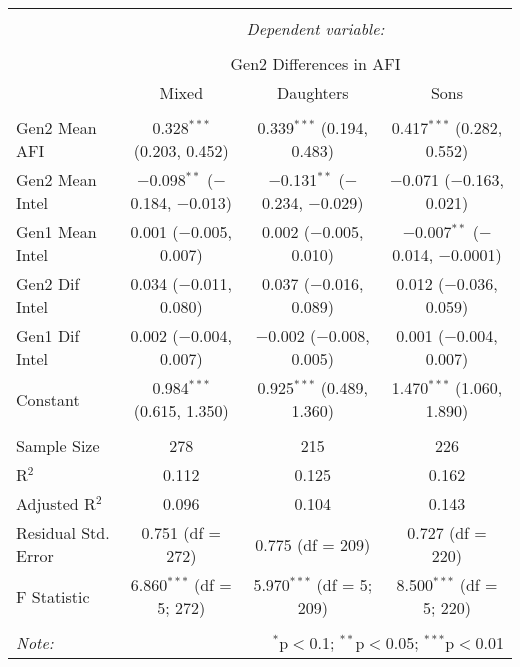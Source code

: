 
\begingroup 
\small 
\begin{tabular}{@{\extracolsep{1pt}}lccc} 
\\[-1.8ex]\hline 
\hline \\[-1.8ex] 
 & \multicolumn{3}{c}{\textit{Dependent variable:}} \\ 
\cline{2-4} 
\\[-1.8ex] & \multicolumn{3}{c}{Gen2 Differences in AFI} \\ 
 & Mixed & Daughters & Sons \\ 
\hline \\[-1.8ex] 
 Gen2 Mean AFI & 0.328$^{***}$ (0.203, 0.452) & 0.339$^{***}$ (0.194, 0.483) & 0.417$^{***}$ (0.282, 0.552) \\ 
  Gen2 Mean Intel & $-$0.098$^{**}$ ($-$0.184, $-$0.013) & $-$0.131$^{**}$ ($-$0.234, $-$0.029) & $-$0.071 ($-$0.163, 0.021) \\ 
  Gen1 Mean Intel & 0.001 ($-$0.005, 0.007) & 0.002 ($-$0.005, 0.010) & $-$0.007$^{**}$ ($-$0.014, $-$0.0001) \\ 
  Gen2 Dif Intel & 0.034 ($-$0.011, 0.080) & 0.037 ($-$0.016, 0.089) & 0.012 ($-$0.036, 0.059) \\ 
  Gen1 Dif Intel & 0.002 ($-$0.004, 0.007) & $-$0.002 ($-$0.008, 0.005) & 0.001 ($-$0.004, 0.007) \\ 
  Constant & 0.984$^{***}$ (0.615, 1.350) & 0.925$^{***}$ (0.489, 1.360) & 1.470$^{***}$ (1.060, 1.890) \\ 
 \hline \\[-1.8ex] 
Sample Size & 278 & 215 & 226 \\ 
R$^{2}$ & 0.112 & 0.125 & 0.162 \\ 
Adjusted R$^{2}$ & 0.096 & 0.104 & 0.143 \\ 
Residual Std. Error & 0.751 (df = 272) & 0.775 (df = 209) & 0.727 (df = 220) \\ 
F Statistic & 6.860$^{***}$ (df = 5; 272) & 5.970$^{***}$ (df = 5; 209) & 8.500$^{***}$ (df = 5; 220) \\ 
\hline 
\hline \\[-1.8ex] 
\textit{Note:}  & \multicolumn{3}{r}{$^{*}$p$<$0.1; $^{**}$p$<$0.05; $^{***}$p$<$0.01} \\ 
\end{tabular} 
\endgroup 
